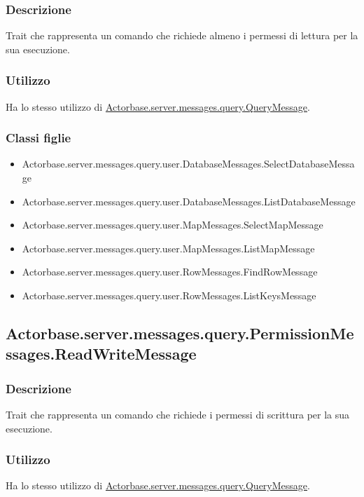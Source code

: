 \documentclass[a4paper]{article}
\begin{document}
			\subsubsection{Descrizione}
				Trait che rappresenta un comando che richiede almeno i permessi di lettura per la sua esecuzione.
				
			\subsubsection{Utilizzo}
				Ha lo stesso utilizzo di \hyperref[QueryMessage]{Actorbase.server.messages.query.QueryMessage}.
				
			\subsubsection{Classi figlie}
				\begin{itemize}
					\item Actorbase.server.messages.query.user.DatabaseMessages.SelectDatabaseMessage
					\item Actorbase.server.messages.query.user.DatabaseMessages.ListDatabaseMessage
					\item Actorbase.server.messages.query.user.MapMessages.SelectMapMessage
					\item Actorbase.server.messages.query.user.MapMessages.ListMapMessage
					\item Actorbase.server.messages.query.user.RowMessages.FindRowMessage
					\item Actorbase.server.messages.query.user.RowMessages.ListKeysMessage
				\end{itemize}
				
		\subsection{Actorbase.server.messages.query.PermissionMessages.ReadWriteMessage}
			\subsubsection{Descrizione}
				Trait che rappresenta un comando che richiede i permessi di scrittura per la sua esecuzione.
				
			\subsubsection{Utilizzo}
				Ha lo stesso utilizzo di \hyperref[QueryMessage]{Actorbase.server.messages.query.QueryMessage}.
				
\end{document}
